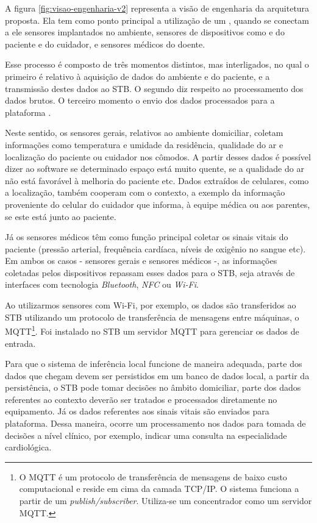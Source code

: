 A figura \ref{fig:visao-engenharia-v2} representa a visão de engenharia da arquitetura
proposta. Ela tem como ponto principal a utilização de um \stb[], quando se
conectam a ele sensores  implantados no ambiente, sensores de dispositivos como
\smartphones[] e  \smartwatches[] do paciente e do cuidador, e sensores médicos
do doente.


Esse processo é composto de três momentos distintos, mas  interligados, no qual
o primeiro é relativo à aquisição de dados do ambiente e do paciente, e a
transmissão destes dados ao STB. O segundo diz respeito ao processamento dos
dados brutos. O terceiro momento o envio dos dados processados para a plataforma
\nextsaude[].

Neste sentido, os sensores gerais, relativos ao ambiente domiciliar, coletam
informações como  temperatura e umidade da residência, qualidade do ar e
localização do paciente ou cuidador nos cômodos. A partir desses dados é
possível dizer ao software se determinado espaço está muito quente, se a
qualidade do ar não está favorável à melhoria do paciente etc. Dados extraídos
de celulares, como a localização, também cooperam com o contexto, a exemplo da
informação proveniente do celular do cuidador que informa, à equipe médica ou
aos parentes, se este está junto ao paciente.

Já os sensores médicos têm como função principal coletar os sinais vitais do
paciente (pressão arterial, frequência cardíaca, níveis de oxigênio no sangue
etc). Em ambos os casos - sensores gerais e sensores médicos -, as informações
coletadas pelos dispositivos repassam  esses dados para o STB, seja através de
interfaces com tecnologia  \textit{Bluetooth}, \textit{NFC} ou \textit{Wi-Fi}.

Ao utilizarmos sensores com Wi-Fi, por exemplo, os dados são transferidos ao
STB utilizando um protocolo de transferência de mensagens entre máquinas, o
MQTT\footnote{O MQTT é um protocolo de transferência de mensagens de baixo
custo computacional e reside em cima da camada TCP/IP. O sistema funciona a
partir de um \textit{publish/subscriber}. Utiliza-se um concentrador como um
servidor MQTT.}.  Foi instalado no STB um servidor MQTT para gerenciar os dados
de entrada.

Para que o sistema de inferência local funcione de maneira adequada, parte dos
dados que chegam devem ser persistidos em um banco de dados local, a partir da
persistência, o STB pode tomar decisões no âmbito domiciliar, parte dos dados
referentes ao contexto deverão ser tratados e processados diretamente no
equipamento.  Já os dados referentes aos sinais vitais são enviados para
plataforma. Dessa maneira, ocorre um processamento nos dados para tomada de
decisões a nível clínico, por exemplo, indicar uma consulta na especialidade
cardiológica.

